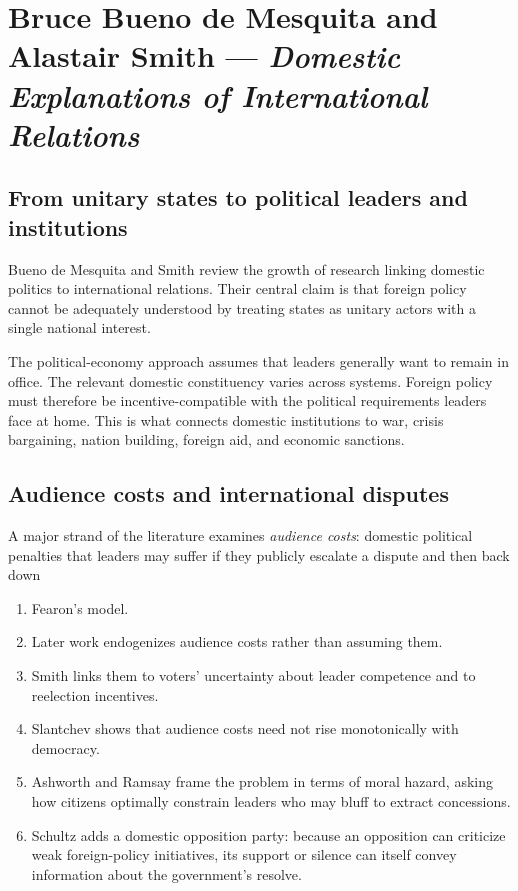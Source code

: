 \clearpage
\section{Bruce Bueno de Mesquita and Alastair Smith --- \emph{Domestic Explanations of International Relations}}

\subsection{From unitary states to political leaders and institutions}

Bueno de Mesquita and Smith review the growth of research linking domestic politics to international relations. Their central claim is that foreign policy cannot be adequately understood by treating states as unitary actors with a single national interest.

The political-economy approach assumes that leaders generally want to remain in office. The relevant domestic constituency varies across systems. Foreign policy must therefore be incentive-compatible with the political requirements leaders face at home. This is what connects domestic institutions to war, crisis bargaining, nation building, foreign aid, and economic sanctions.

\subsection{Audience costs and international disputes}

A major strand of the literature examines \emph{audience costs}: domestic political penalties that leaders may suffer if they publicly escalate a dispute and then back down

\begin{enumerate}
    \item Fearon's model.

    \item Later work endogenizes audience costs rather than assuming them.

    \item Smith links them to voters' uncertainty about leader competence and to reelection incentives.

    \item Slantchev shows that audience costs need not rise monotonically with democracy.

    \item Ashworth and Ramsay frame the problem in terms of moral hazard, asking how citizens optimally constrain leaders who may bluff to extract concessions.

    \item Schultz adds a domestic opposition party: because an opposition can criticize weak foreign-policy initiatives, its support or silence can itself convey information about the government's resolve.
\end{enumerate}

